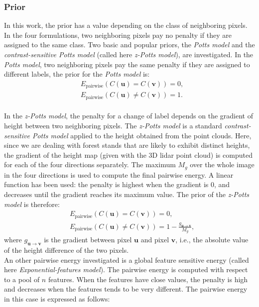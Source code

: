 \subsubsection{Prior}
In this work, the prior has a value depending on the class of neighboring pixels. In the four formulations, two neighboring pixels pay no penalty if they are assigned to the same class. Two basic and popular priors, the \textit{Potts model} and the \textit{contrast-sensitive Potts model} (called here \textit{z-Potts model}), are investigated. In the \textit{Potts model}, two neighboring pixels pay the same penalty if they are assigned to different labels, the prior for the \textit{Potts model} is:
\begin{equation}
\begin{aligned}
& E_{\text{pairwise}}(C(\mathbf{u}) = C(\mathbf{v}))=0, \\
& E_{\text{pairwise}}(C(\mathbf{u}) \neq C(\mathbf{v}))=1.
\end{aligned}
\label{eq:prior1}
\end{equation}\\
In the \textit{z-Potts model}, the penalty for a change of label depends on the gradient of height between two neighboring pixels. The \textit{z-Potts model} is a standard \textit{contrast-sensitive Potts model} applied to the height obtained from the point clouds. Here, since we are dealing with forest stands that are likely to exhibit distinct heights, the gradient of the height map (given with the 3D lidar point cloud) is computed for each of the four directions separately. The maximum $M_{g}$ over the whole image in the four directions is used to compute the final pairwise energy. A linear function has been used: the penalty is highest when the gradient is 0, and decreases until the gradient reaches its maximum value. The prior of the \textit{z-Potts model} is therefore:
\begin{equation}
\begin{aligned}
& E_{\text{pairwise}}(C(\mathbf{u}) = C(\mathbf{v}))=0, \\
& E_{\text{pairwise}}(C(\mathbf{u}) \neq C(\mathbf{v}))=1-\frac{g_{\mathbf{u} \rightarrow \mathbf{v}}}{M_{g}},
\end{aligned}
\label{eq:prior2}
\end{equation}
where $g_{\mathbf{u} \rightarrow \mathbf{v}}$ is the gradient between pixel $\mathbf{u}$ and pixel $\mathbf{v}$, i.e., the absolute value of the height difference of the two pixels.\\
An other pairwise energy investigated is a global feature sensitive energy (called here \textit{Exponential-features model}). The pairwise energy is computed with respect to a pool of $n$ features. When the features have close values, the penalty is high and decreases when the features tends to be very different. The pairwise energy in this case is expressed as follows:
